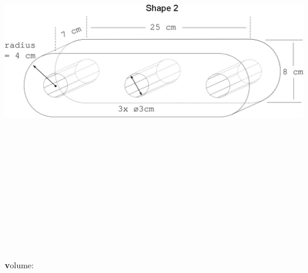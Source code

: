 \documentclass[11pt]{article}
\begin{document}
\begin{description}
\begin{enumerate}
            	\includegraphics[scale=.25]{images/lab1_fig2.png}
		\vspace{5mm}\\
\underline{\hspace{140mm}}\\\\
\underline{\hspace{140mm}}\\\\
\underline{\hspace{140mm}}\\\\
\underline{\hspace{140mm}}\\\\
\underline{\hspace{140mm}}\\\\
\underline{\hspace{140mm}}\\\\
{\textbf volume: \underline{\hspace{60mm}}}\\
\underline{\hspace{140mm}}\\\\
\underline{\hspace{140mm}}\\\\
\underline{\hspace{140mm}}\\\\
\underline{\hspace{140mm}}\\\\
\underline{\hspace{140mm}}\\\\
\underline{\hspace{140mm}}\\\\		
	

\end{enumerate}
\end{description}
\end{document}
